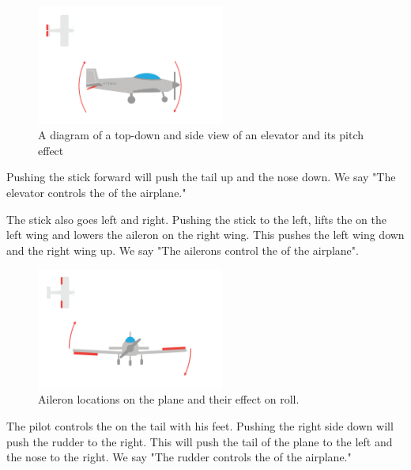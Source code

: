 \begin{figure}[htbp]
  \centering
  \includegraphics[width=0.55\textwidth]{elevator.png}
  \caption{A diagram of a top-down and side view of an elevator and its pitch effect}\label{fig:elevator}
\end{figure}

Pushing the stick forward will push the tail up and the nose down. We say "The elevator controls the  of the airplane."

The stick also goes left and right. Pushing the stick to the left, lifts the  on the left wing and lowers the aileron on the right wing. This pushes the left wing down and
the right wing up. We say "The ailerons control the  of the airplane".

\begin{figure}[htbp]
  \centering
  \includegraphics[width=0.55\textwidth]{ailerons.png}
  \caption[Ailerons and roll]{Aileron locations on the plane and their effect on roll.}
  \label{fig:ailerons}
\end{figure}



The pilot controls the  on the tail with his feet. Pushing the right side down will push the rudder to the right. This will push the tail of the plane to the left and the
nose to the right. We say "The rudder controls the  of the airplane."

